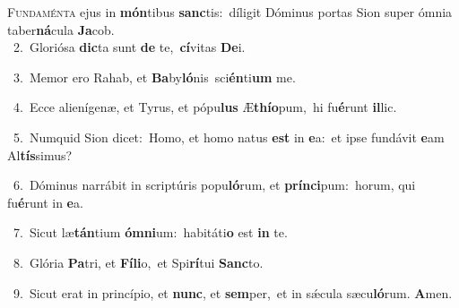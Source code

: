 \lettrine{\initial\textcolor{\initialcolor}{F}}{undaménta} ejus in \textbf{món}\-tibus \textbf{sanc}\-tis:~\star díligit Dóminus portas Sion super ómnia taber\-\textbf{ná}\-cula \textbf{Ja}\-cob.\\
{\numbfont\textcolor{\numbcolor}{~2.}}~Gloriósa \textbf{dic}\-ta sunt \textbf{de} te,~\star \textbf{cí}\-vitas \textbf{De}\-i.\par
{\numbfont\textcolor{\numbcolor}{~3.}}~Memor ero Rahab, et \textbf{Ba}\-by\-\textbf{ló}\-nis~\star sci\-\textbf{én}\-ti\textbf{um} me.\par
{\numbfont\textcolor{\numbcolor}{~4.}}~Ecce alienígenæ, et Tyrus, et pópu\textbf{lus} Æ\-\textbf{thí}\-\textbf{o}pum,~\star hi fu\-\textbf{é}\-runt \textbf{il}\-lic.\par
{\numbfont\textcolor{\numbcolor}{~5.}}~Numquid Sion dicet:~\dagger Homo, et homo natus \textbf{est} in \textbf{e}\-a:~\star et ipse fundávit \textbf{e}\-am Al\-\textbf{tís}\-simus?\par
{\numbfont\textcolor{\numbcolor}{~6.}}~Dóminus narrábit in scriptúris popu\-\textbf{ló}\-rum, et \textbf{prín}\-\textbf{ci}pum:~\star horum, qui fu\-\textbf{é}\-runt in \textbf{e}\-a.\par
{\numbfont\textcolor{\numbcolor}{~7.}}~Sicut læ\-\textbf{tán}\-tium \textbf{óm}\-\textbf{ni}um:~\star habitáti\textbf{o} est \textbf{in} te.\par
{\numbfont\textcolor{\numbcolor}{~8.}}~Glória \textbf{Pa}\-tri, et \textbf{Fí}\-\textbf{li}o,~\star et Spi\-\textbf{rí}\-tui \textbf{Sanc}\-to.\par
{\numbfont\textcolor{\numbcolor}{~9.}}~Sicut erat in princípio, et \textbf{nunc}\-, et \textbf{sem}\-per,~\star et in sǽcula sæcu\-\textbf{ló}\-rum. \textbf{A}\-men.\par

